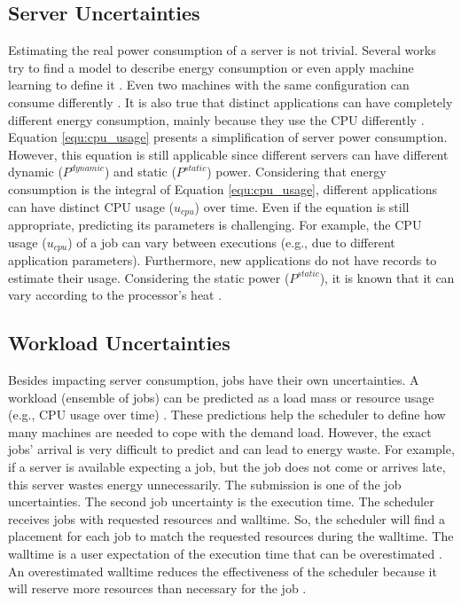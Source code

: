 
\subsection{Server Uncertainties}
Estimating the real power consumption of a server is not trivial. Several works try to find a model to describe energy consumption or even apply machine learning to define it \cite{dayarathna2015data}. Even two machines with the same configuration can consume differently \cite{orgerie2010demystifying}. It is also true that distinct applications can have completely different energy consumption, mainly because they use the CPU differently \cite{orgerie2010demystifying, jay2023experimental}. Equation \ref{equ:cpu_usage} presents a simplification of server power consumption. However, this equation is still applicable since different servers can have different dynamic ($P^{dynamic}$) and static ($P^{static}$) power. Considering that energy consumption is the integral of Equation \ref{equ:cpu_usage}, different applications can have distinct CPU usage ($u_{cpu}$) over time. Even if the equation is still appropriate, predicting its parameters is challenging. For example, the CPU usage ($u_{cpu}$) of a job can vary between executions (e.g., due to different application parameters). Furthermore, new applications do not have records to estimate their usage. Considering the static power ($P^{static}$), it is known that it can vary according to the processor's heat \cite{patterson2008effect}.

\subsection{Workload Uncertainties}
Besides impacting server consumption, jobs have their own uncertainties. A workload (ensemble of jobs) can be predicted as a load mass or resource usage (e.g., CPU usage over time) \cite{masdari2020survey, vashistha2020literature}. These predictions help the scheduler to define how many machines are needed to cope with the demand load. However, the exact jobs' arrival is very difficult to predict and can lead to energy waste. For example, if a server is available expecting a job, but the job does not come or arrives late, this server wastes energy unnecessarily. The submission is one of the job uncertainties. The second job uncertainty is the execution time. The scheduler receives jobs with requested resources and walltime. So, the scheduler will find a placement for each job to match the requested resources during the walltime. The walltime is a user expectation of the execution time that can be overestimated \cite{takizawa2020effect}. An overestimated walltime reduces the effectiveness of the scheduler because it will reserve more resources than necessary for the job \cite{srinivasan2002characterization, takizawa2020effect}. 

